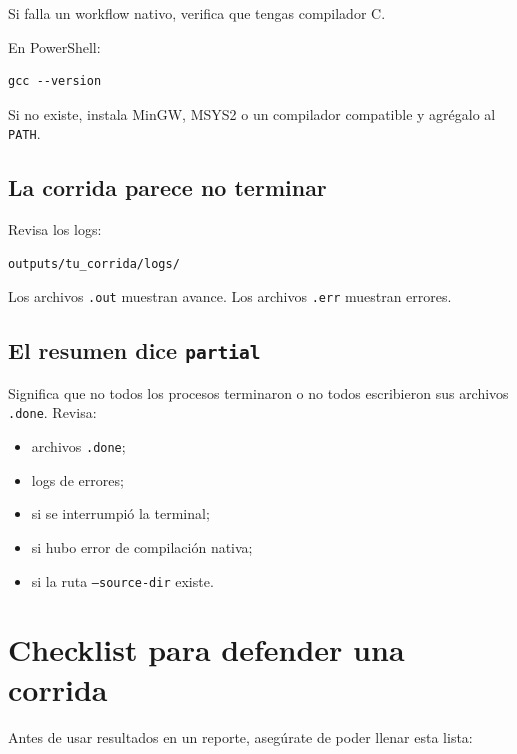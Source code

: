 \documentclass[11pt,letterpaper]{article}
\begin{document}
Si falla un workflow nativo, verifica que tengas compilador C.

En PowerShell:

\begin{lstlisting}[style=terminal]
gcc --version
\end{lstlisting}

Si no existe, instala MinGW, MSYS2 o un compilador compatible y agrégalo al \texttt{PATH}.

\subsection{La corrida parece no terminar}

Revisa los logs:

\begin{lstlisting}[style=terminal]
outputs/tu_corrida/logs/
\end{lstlisting}

Los archivos \texttt{.out} muestran avance. Los archivos \texttt{.err} muestran errores.

\subsection{El resumen dice \texttt{partial}}

Significa que no todos los procesos terminaron o no todos escribieron sus archivos \texttt{.done}. Revisa:

\begin{itemize}
  \item archivos \texttt{.done};
  \item logs de errores;
  \item si se interrumpió la terminal;
  \item si hubo error de compilación nativa;
  \item si la ruta \texttt{--source-dir} existe.
\end{itemize}

\section{Checklist para defender una corrida}

Antes de usar resultados en un reporte, asegúrate de poder llenar esta lista:
\end{document}
